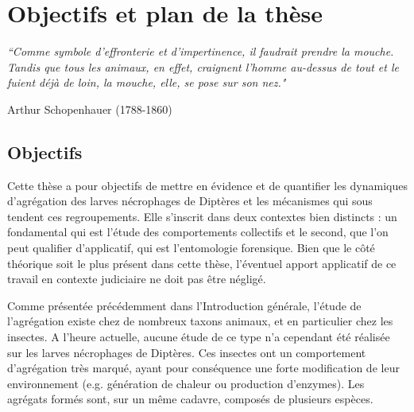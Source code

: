 
\chapter*{Objectifs et plan de la thèse} %
\label{Methodo} %


\textit{``Comme symbole d'effronterie et d'impertinence, il faudrait prendre la mouche. Tandis que tous les animaux, en effet, craignent l'homme au-dessus de tout et le fuient déjà de loin, la mouche, elle, se pose sur son nez."}

\begin{flushright}
Arthur Schopenhauer (1788-1860)
\end{flushright}

\cleardoublepage


	\section{Objectifs}
Cette thèse a pour objectifs de mettre en évidence et de quantifier les dynamiques d’agrégation des larves nécrophages de Diptères et les mécanismes qui sous tendent ces regroupements. Elle s'inscrit dans deux contextes bien distincts : un fondamental qui est l'étude des comportements collectifs et le second, que l'on peut qualifier d'applicatif, qui est l'entomologie forensique. Bien que le côté théorique soit le plus présent dans cette thèse, l'éventuel apport applicatif de ce travail en contexte judiciaire ne doit pas être négligé.

Comme présentée précédemment dans l'Introduction générale, l'étude de l'agrégation existe chez de nombreux taxons animaux, et en particulier chez les insectes. A l'heure actuelle, aucune étude de ce type n'a cependant été réalisée sur les larves nécrophages de Diptères. Ces insectes ont un comportement d'agrégation très marqué, ayant pour conséquence une forte modification de leur environnement (e.g. génération de chaleur ou production d'enzymes). Les agrégats formés sont, sur un même cadavre, composés de plusieurs espèces.

